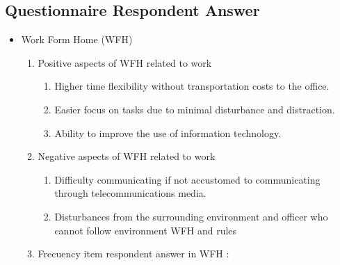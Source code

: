 \documentclass[conference]{IEEEtran}
\begin{document}
\subsection{Questionnaire Respondent Answer }
\begin{itemize}
\item {Work Form Home (WFH)}
\begin{enumerate}
\item{Positive aspects of WFH related to work}
\begin{enumerate}
\item Higher time flexibility without transportation costs to the office.
\item Easier focus on tasks due to minimal disturbance and distraction.
\item Ability to improve the use of information technology.
\end{enumerate}
\item{Negative aspects of WFH related to work}
\begin{enumerate}
\item Difficulty communicating if not accustomed to communicating through telecommunications media.
\item Disturbances from the surrounding environment and officer who cannot follow environment WFH and rules
\end{enumerate}
\item Frecuency item respondent answer in WFH :

\centering
{} \label{tab:title} 
\begin{table}[h]


\end{table}
\end{enumerate}
\end{itemize}
\end{document}
